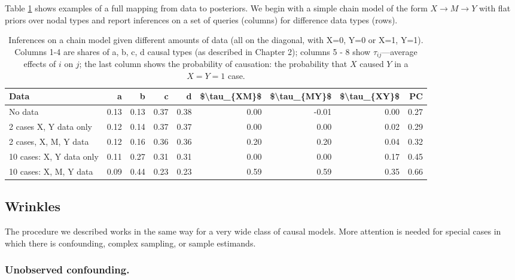 \documentclass[
  12pt,
]{book}
\begin{document}
Table \ref{tab:chainillustration} shows examples of a full mapping from data to posteriors. We begin with a simple chain model of the form \(X\rightarrow M \rightarrow Y\) with flat priors over nodal types and report inferences on a set of queries (columns) for difference data types (rows).

\begin{table}

\caption{\label{tab:chainillustration}Inferences on a chain model given different amounts of data (all on the diagonal, with X=0, Y=0 or X=1, Y=1). Columns 1-4 are shares of a, b, c, d causal types (as described in Chapter 2); columns 5 - 8 show $\tau_{ij}$---average effects of $i$ on $j$; the last column shows the probability of causation: the probability that $X$ caused $Y$ in a $X=Y=1$ case.}
\centering
\begin{tabular}[t]{l|r|r|r|r|r|r|r|r}
\hline
Data & a & b & c & d & \$\textbackslash{}tau\_\{XM\}\$ & \$\textbackslash{}tau\_\{MY\}\$ & \$\textbackslash{}tau\_\{XY\}\$ & PC\\
\hline
No data & 0.13 & 0.13 & 0.37 & 0.38 & 0.00 & -0.01 & 0.00 & 0.27\\
\hline
2 cases X, Y data only & 0.12 & 0.14 & 0.37 & 0.37 & 0.00 & 0.00 & 0.02 & 0.29\\
\hline
2 cases, X, M, Y data & 0.12 & 0.16 & 0.36 & 0.36 & 0.20 & 0.20 & 0.04 & 0.32\\
\hline
10 cases: X, Y data only & 0.11 & 0.27 & 0.31 & 0.31 & 0.00 & 0.00 & 0.17 & 0.45\\
\hline
10 cases: X, M, Y data & 0.09 & 0.44 & 0.23 & 0.23 & 0.59 & 0.59 & 0.35 & 0.66\\
\hline
\end{tabular}
\end{table}

\hypertarget{wrinkles}{%
\subsection{Wrinkles}\label{wrinkles}}

The procedure we described works in the same way for a very wide class of causal models. More attention is needed for special cases in which there is confounding, complex sampling, or sample estimands.

\hypertarget{unobserved-confounding.}{%
\subsubsection{Unobserved confounding.}\label{unobserved-confounding.}}
\end{document}
